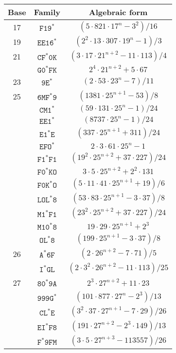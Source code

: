 \documentclass[12pt]{article}
\theoremstyle{plain}
\theoremstyle{definition}
\newcommand{\0}{\mathtt{0}}
\newcommand{\1}{\mathtt{1}}
\newcommand{\2}{\mathtt{2}}
\newcommand{\3}{\mathtt{3}}
\newcommand{\4}{\mathtt{4}}
\newcommand{\5}{\mathtt{5}}
\newcommand{\6}{\mathtt{6}}
\newcommand{\7}{\mathtt{7}}
\newcommand{\8}{\mathtt{8}}
\newcommand{\9}{\mathtt{9}}
\begin{document}
\begin{figure}%
\begin{center}\begin{tabular}{ccc}
Base & Family & Algebraic form \\ \hline
17 & $\mathtt{F19^*}$ & $(5\cdot821\cdot17^n-3^2)/16$ \\
19 & $\mathtt{EE16^*}$ & $(2^2\cdot13\cdot307\cdot19^n-1)/3$ \\
21 & $\mathtt{CF^*0K}$ & $(3\cdot17\cdot21^{n+2}-11\cdot113)/4$ \\
& $\mathtt{G0^*FK}$ & $2^4\cdot21^{n+2}+5\cdot67$ \\
23 & $\mathtt{9E^*}$ & $(2\cdot53\cdot23^n-7)/11$ \\
25 & $\mathtt{6MF^*9}$ & $(1381\cdot25^{n+1}-53)/8$ \\
& $\mathtt{CM1^*}$ & $(59\cdot131\cdot25^n-1)/24$ \\
& $\mathtt{EE1^*}$ & $(8737\cdot25^n-1)/24$ \\
& $\mathtt{E1^*E}$ & $(337\cdot25^{n+1}+311)/24$ \\
& $\mathtt{EFO^*}$ & $2\cdot3\cdot61\cdot25^n-1$ \\
& $\mathtt{F1^*F1}$ & $(19^2\cdot25^{n+2}+37\cdot227)/24$ \\
& $\mathtt{F0^*KO}$ & $3\cdot5\cdot25^{n+2}+2^2\cdot131$ \\
& $\mathtt{F0K^*O}$ & $(5\cdot11\cdot41\cdot25^{n+1}+19)/6$ \\
& $\mathtt{LOL^*8}$ & $(53\cdot83\cdot25^{n+1}-3\cdot37)/8$ \\
& $\mathtt{M1^*F1}$ & $(23^2\cdot25^{n+2}+37\cdot227)/24$ \\
& $\mathtt{M10^*8}$ & $19\cdot29\cdot25^{n+1}+2^3$ \\
& $\mathtt{OL^*8}$ & $(199\cdot25^{n+1}-3\cdot37)/8$ \\
26 & $\mathtt{A^*6F}$ & $(2\cdot26^{n+2}-7\cdot71)/5$ \\
& $\mathtt{I^*GL}$ & $(2\cdot3^2\cdot26^{n+2}-11\cdot113)/25$ \\
27 & $\mathtt{80^*9A}$ & $2^3\cdot27^{n+2}+11\cdot23$ \\
& $\mathtt{999G^*}$ & $(101\cdot877\cdot27^n-2^3)/13$ \\
& $\mathtt{CL^*E}$ & $(3^2\cdot37\cdot27^{n+1}-7\cdot29)/26$ \\
& $\mathtt{EI^*F8}$ & $(191\cdot27^{n+2}-2^3\cdot149)/13$ \\
& $\mathtt{F^*9FM}$ & $(3\cdot5\cdot27^{n+3}-113557)/26$ \\

\end{tabular}
\end{center}
\end{figure}
\end{document}
